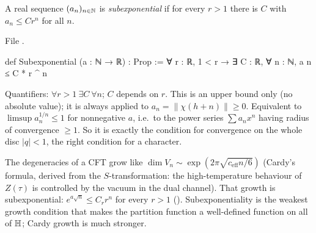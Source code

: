 \begin{definition}\label{l14:def:subexp}
A real sequence $(a_n)_{n\in{\mathbb{N}}}$ is \emph{subexponential} if for every $r>1$ there is $C$ with $a_n\le Cr^n$ for all $n$.
\end{definition}
\noindent File .
\begin{leancode}
def Subexponential (a : ℕ → ℝ) : Prop :=
  ∀ r : ℝ, 1 < r → ∃ C : ℝ, ∀ n : ℕ, a n ≤ C * r ^ n
\end{leancode}
\begin{dictionary}
Quantifiers: $\forall r>1\ \exists C\ \forall n$; $C$ depends on $r$. This is an upper bound only (no absolute value); it is
always applied to $a_n = \|\chi(h+n)\|\ge0$. Equivalent to $\limsup a_n^{1/n}\le1$ for nonnegative $a$, i.e.\ to the power
series $\sum a_nx^n$ having radius of convergence $\ge1$. So it is exactly the condition for convergence on the whole disc
$|q|<1$, the right condition for a character.
\end{dictionary}
\begin{physics}
The degeneracies of a CFT grow like $\dim V_n\sim\exp(2\pi\sqrt{c_{\mathrm{eff}}n/6})$ (Cardy's formula, derived from the
$S$-transformation: the high-temperature behaviour of $Z(\tau)$ is controlled by the vacuum in the dual channel). That growth
is subexponential: $e^{a\sqrt n}\le C_r r^n$ for every $r>1$ (). Subexponentiality is the
weakest growth condition that makes the partition function a well-defined function on all of $\mathbb{H}$; Cardy growth is
much stronger.
\end{physics}

